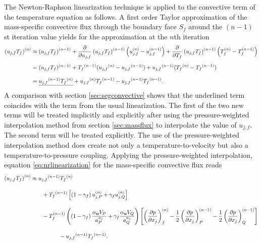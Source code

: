The Newton-Raphson linearization technique is applied to the convective term of the temperature equation as follows. A first order Taylor approximation of the mass-specific convective flux through the boundary face \(S_f\) around the \((n-1)\)st iteration value yields for the approximation at the \(n\)th iteration
\begin{align}
  \label{eq:nrlinearization}
  \left(u_{j,f} T_f \right)^{(n)} 
  &\approx 
  \left(u_{j,f} T_f \right)^{(n-1)} 
  + \frac{\partial}{\partial u_{j,f}}\left( u_{j,f} T_f \right)^{(n-1)} \left(u_{j,f}^{(n)} - u_{j,f}^{(n-1)} \right) 
  + \frac{\partial}{\partial T_f}\left( u_{j,f} T_f \right)^{(n-1)} \left( T_f^{(n)} - T_f^{(n-1)} \right) \nonumber\\[0.5em]
  &=
  (u_{j,f} T_f )^{(n-1)} 
  + \vphantom{(u_{j,f} T_f)}{T_f}^{(n-1)} (\vphantom{(u_{j,f} T_f)}{u_{j,f}}^{(n)} - \vphantom{(u_{j,f} T_f)}{u_{j,f}}^{(n-1)} ) 
  +  \vphantom{(u_j T)}{u_{j,f}}^{(n-1)} ( \vphantom{(u_j T)}{T_f}^{(n)} - \vphantom{(u_j T)}{T_f}^{(n-1)} ) \nonumber\\[0.7em]
  &=
  \underline{\vphantom{(u_j T)}{u_{j,f}}^{(n-1)} \vphantom{(u_{j,f})}{T_f}^{(n)}}  + \vphantom{(u_{j,f} T_f)}{u_{j,f}}^{(n)} \vphantom{(u_jT)}{T_f}^{(n-1)}  -  \vphantom{(u_j T)}{u_{j,f}}^{(n-1)} \vphantom{(u_j T)}{T_f}^{(n-1)}.
\end{align}
A comparison with section \ref{sec:segconvective} shows that the underlined term coincides with the term from the usual linearization. The first of the two new terms will be treated implicitly and explicitly after using the pressure-weighted interpolation method from section \ref{sec:massflux} to interpolate the value of \(u_{j,f}\). The second term will be treated explicitly. The use of the pressure-weighted interpolation method does create not only a temperature-to-velocity but also a temperature-to-pressure coupling. Applying the pressure-weighted interpolation, equation \ref{eq:nrlinearization} for the mass-specific convective flux reads
\begin{align*}
  \left(u_{j,f} T_f \right)^{(n)} 
  &\approx 
    \vphantom{(u_j T)}{u_{j,f}}^{(n-1)} \vphantom{(u_{j,f})}{T_f}^{(n)} \\[1em]
    &\quad\quad
    + \vphantom{(u_jT)}{T_f}^{(n-1)}  \left[\left(1 - \gamma_f\right) u_{j,P}^{(n)} + \gamma_f u_{j,Q}^{(n)} \right] \nonumber\\[1em]
    &\quad\quad 
    - T_f^{(n-1)}\left(\left(1 - \gamma_f\right) \frac{\alpha_\vec{u} V_P}{a_P^{u_j}} + \gamma_f \frac{\alpha_\vec{u} V_Q}{a_Q^{u_j}}\right)
    \left[ 
    \left(\frac{\partial p}{\partial x_j}\right)_f^{(n)} 
    -  \frac{1}{2} \left( \frac{\partial p}{\partial x_j} \right)_P^{(n-1)} 
    - \frac{1}{2} \left(\frac{\partial p}{\partial x_j}\right)_Q^{(n-1)} 
    \right] \nonumber \\[1em]
    &  \quad\quad\quad\quad\quad -\vphantom{(u_j T)}{u_{j,f}}^{(n-1)} \vphantom{(u_j T)}{T_f}^{(n-1)}.
\end{align*}
